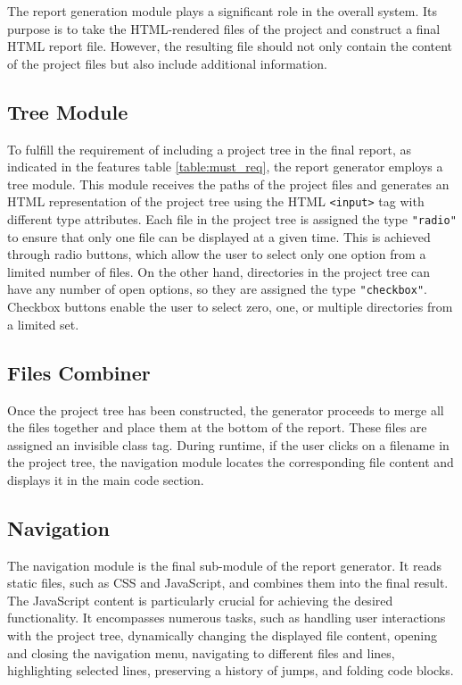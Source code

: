 The report generation module plays a significant role in the overall system. Its purpose is to take the HTML-rendered files of the project and construct a final HTML report file. However, the resulting file should not only contain the content of the project files but also include additional information.

\subsection*{Tree Module}
To fulfill the requirement of including a project tree in the final report, as indicated in the features table \ref{table:must_req}, the report generator employs a tree module. This module receives the paths of the project files and generates an HTML representation of the project tree using the HTML \texttt{<input>} tag with different type attributes. Each file in the project tree is assigned the type \texttt{"radio"} to ensure that only one file can be displayed at a given time. This is achieved through radio buttons, which allow the user to select only one option from a limited number of files. On the other hand, directories in the project tree can have any number of open options, so they are assigned the type \texttt{"checkbox"}. Checkbox buttons enable the user to select zero, one, or multiple directories from a limited set.

\subsection*{Files Combiner}
Once the project tree has been constructed, the generator proceeds to merge all the files together and place them at the bottom of the report. These files are assigned an invisible class tag. During runtime, if the user clicks on a filename in the project tree, the navigation module locates the corresponding file content and displays it in the main code section.

\subsection*{Navigation}
\label{chap:impl:navigation}
The navigation module is the final sub-module of the report generator. It reads static files, such as CSS and JavaScript, and combines them into the final result. The JavaScript content is particularly crucial for achieving the desired functionality. It encompasses numerous tasks, such as handling user interactions with the project tree, dynamically changing the displayed file content, opening and closing the navigation menu, navigating to different files and lines, highlighting selected lines, preserving a history of jumps, and folding code blocks.

